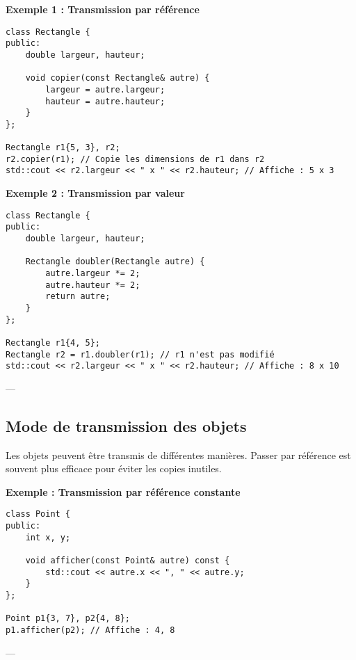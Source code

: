 \textbf{Exemple 1 : Transmission par référence}
\begin{tcolorbox}[colframe=blue!50!black, colback=blue!5!white, title=Exemple d'Attributs et Méthodes Statistiques, float=htb]
\begin{verbatim}
class Rectangle {
public:
    double largeur, hauteur;

    void copier(const Rectangle& autre) {
        largeur = autre.largeur;
        hauteur = autre.hauteur;
    }
};

Rectangle r1{5, 3}, r2;
r2.copier(r1); // Copie les dimensions de r1 dans r2
std::cout << r2.largeur << " x " << r2.hauteur; // Affiche : 5 x 3
\end{verbatim}
\end{tcolorbox}
\textbf{Exemple 2 : Transmission par valeur}
\begin{tcolorbox}[colframe=blue!50!black, colback=blue!5!white, title=Exemple d'Attributs et Méthodes Statistiques, float=htb]
\begin{verbatim}
class Rectangle {
public:
    double largeur, hauteur;

    Rectangle doubler(Rectangle autre) {
        autre.largeur *= 2;
        autre.hauteur *= 2;
        return autre;
    }
};

Rectangle r1{4, 5};
Rectangle r2 = r1.doubler(r1); // r1 n'est pas modifié
std::cout << r2.largeur << " x " << r2.hauteur; // Affiche : 8 x 10
\end{verbatim}
\end{tcolorbox}
---

\subsection{ Mode de transmission des objets}
Les objets peuvent être transmis de différentes manières. Passer par référence est souvent plus efficace pour éviter les copies inutiles.

\textbf{Exemple : Transmission par référence constante}
\begin{tcolorbox}[colframe=blue!50!black, colback=blue!5!white, title=Exemple d'Attributs et Méthodes Statistiques, float=htb]
\begin{verbatim}
class Point {
public:
    int x, y;

    void afficher(const Point& autre) const {
        std::cout << autre.x << ", " << autre.y;
    }
};

Point p1{3, 7}, p2{4, 8};
p1.afficher(p2); // Affiche : 4, 8
\end{verbatim}
\end{tcolorbox}
---

